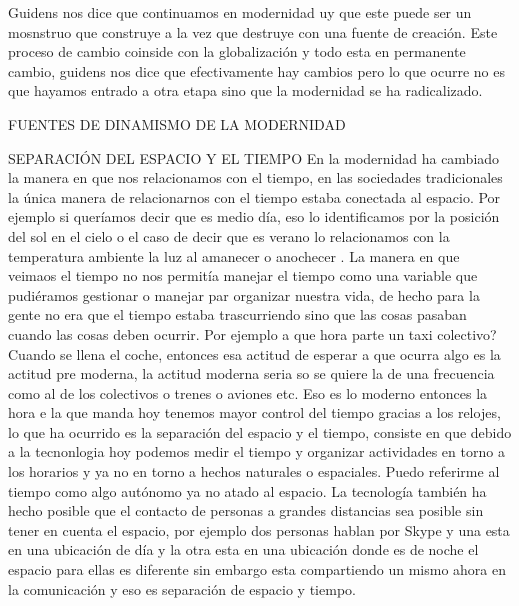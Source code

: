 \documentclass[12pt]{book}
\begin{document}
Guidens nos dice que continuamos en modernidad uy que este puede ser un mosnstruo que construye a la vez que destruye con una fuente de creación. Este proceso de cambio coinside con la globalización y todo esta en permanente cambio, guidens nos dice que efectivamente hay cambios pero lo que ocurre no es que hayamos entrado a otra etapa sino que la modernidad se ha radicalizado.

FUENTES DE DINAMISMO DE LA MODERNIDAD

SEPARACIÓN  DEL ESPACIO Y EL TIEMPO
En la modernidad ha cambiado la manera en que nos relacionamos con el tiempo, en las sociedades tradicionales la única manera de relacionarnos con el tiempo estaba conectada al espacio.
Por ejemplo si queríamos decir que es medio día, eso lo identificamos por la posición del sol en el cielo o el caso de decir que es verano lo relacionamos con la temperatura ambiente la luz al amanecer o anochecer .
La manera en que veimaos el tiempo no nos permitía manejar el tiempo como una variable que pudiéramos gestionar o manejar par organizar nuestra vida, de hecho para la gente no era que el tiempo estaba trascurriendo sino que las cosas pasaban cuando las cosas deben ocurrir.
Por ejemplo a que hora parte un taxi colectivo? Cuando se llena el coche, entonces esa actitud de esperar a que ocurra algo es la actitud pre moderna, la actitud moderna seria so se quiere la de una frecuencia como al de los colectivos o trenes o aviones etc. Eso es lo moderno entonces la hora e la que manda
hoy tenemos  mayor control del  tiempo gracias a los relojes, lo que ha ocurrido es la separación del espacio y el tiempo, consiste en que debido a la tecnonlogia hoy podemos medir el tiempo y organizar actividades en torno a los horarios y ya no en torno a hechos naturales o espaciales.
Puedo referirme al tiempo como algo autónomo ya no atado al espacio.
La tecnología también ha hecho posible que el contacto de personas a grandes distancias sea posible sin tener en cuenta el espacio, por ejemplo dos personas hablan por Skype y una esta en una ubicación de día y la otra esta en una ubicación donde es de noche el espacio para ellas es diferente sin embargo esta compartiendo un mismo ahora en la comunicación y eso es separación de espacio y tiempo.
\end{document}
